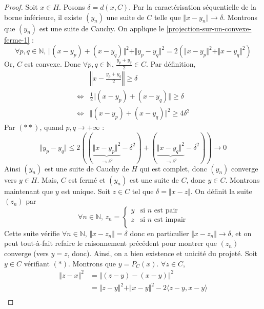   \begin{proof}
    Soit $x \in H$. Posons $\delta = d(x, C)$. Par la caractérisation séquentielle de la borne inférieure, il existe $(y_n)$ une suite de $C$ telle que $\Vert x - y_n \Vert \longrightarrow \delta$. Montrons que $(y_n)$ est une suite de Cauchy. On applique le \cref{projection-sur-un-convexe-ferme-1} :
    \[ \forall p, q \in \mathbb{N}, \, \Vert (x - y_p) + (x - y_q) \Vert^2 + \Vert y_p - y_q \Vert^2 = 2(\Vert x - y_p \Vert^2 + \Vert x - y_q \Vert^2) \tag{$**$} \]
    Or, $C$ est convexe. Donc $\forall p, q \in \mathbb{N}$, $\frac{y_p + y_q}{2} \in C$.
    Par définition,
    \begin{align*}
      & \left\Vert x - \frac{y_p + y_q}{2} \right\Vert \geq \delta \\
      \iff& \frac{1}{2} \Vert (x - y_p) + (x - y_q) \Vert \geq \delta \\
      \iff& \Vert (x - y_p) + (x - y_q) \Vert^2 \geq 4 \delta^2
    \end{align*}
    Par $(**)$, quand $p, q \longrightarrow +\infty$ :
    \[ \Vert y_p - y_q \Vert \leq 2((\underbrace{\Vert x - y_p \Vert^2}_{\longrightarrow \delta^2} - \delta^2) + (\underbrace{\Vert x - y_q \Vert^2}_{\longrightarrow \delta^2} - \delta^2)) \longrightarrow 0 \]
    Ainsi $(y_n)$ est une suite de Cauchy de $H$ qui est complet, donc $(y_n)$ converge vers $y \in H$. Mais, $C$ est fermé et $(y_n)$ est une suite de $C$, donc $y \in C$.
    \newpar
    Montrons maintenant que $y$ est unique. Soit $z \in C$ tel que $\delta = \Vert x - z \Vert$. On définit la suite $(z_n)$ par
    \[ \forall n \in \mathbb{N}, \, z_n =
    \begin{cases}
      y &\text{si } n \text{ est pair} \\
      z &\text{si } n \text{ est impair} \\
    \end{cases}
    \]
    Cette suite vérifie $\forall n \in \mathbb{N}$, $\Vert x - z_n \Vert = \delta$ donc en particulier $\Vert x - z_n \Vert \longrightarrow \delta$, et on peut tout-à-fait refaire le raisonnement précédent pour montrer que $(z_n)$ converge (vers $y = z$, donc). Ainsi, on a bien existence et unicité du projeté.
    \newpar
    Soit $y \in C$ vérifiant $(*)$. Montrons que $y = P_C(x)$. $\forall z \in C$,
    \begin{align*}
      \Vert z - x \Vert^2 &= \Vert (z - y) - (x - y) \Vert^2 \\
      &= \Vert z - y \Vert^2 + \Vert x - y \Vert^2 - 2 \langle z - y, x - y \rangle \\

\end{align*}
\end{proof}

